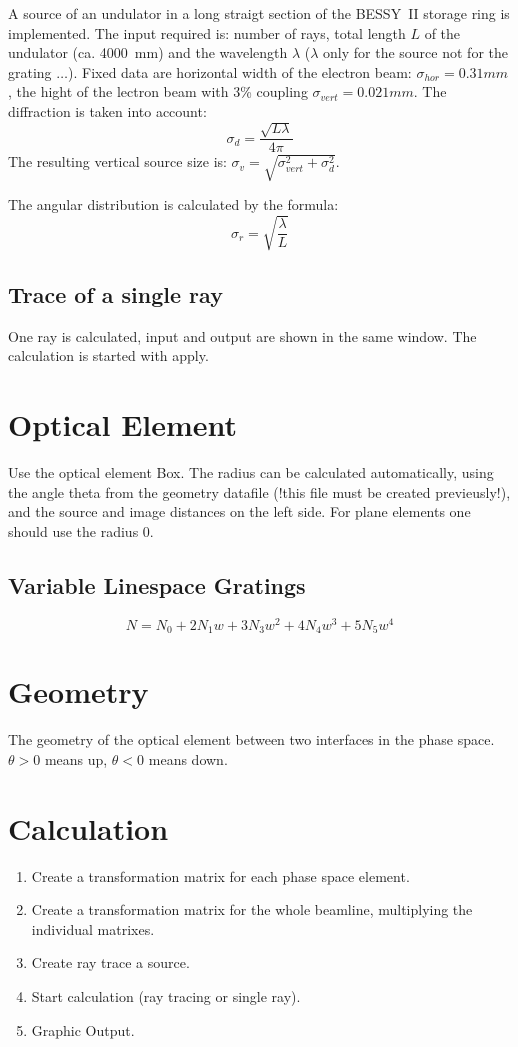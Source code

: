 A source of an undulator in a long straigt section of the
BESSY~II storage ring is implemented. The input required is: number of rays,
total length $L$ of the undulator (ca. 4000~mm) and the wavelength $ \lambda$
($\lambda$ only for the source not for the grating $\ldots$). 
Fixed data are  
horizontal width of the electron beam: $\sigma_{hor} = 0.31 mm$, the hight of 
the lectron beam with 3\% coupling $\sigma_{vert} = 0.021 mm$. The diffraction 
is taken into account:
\[ \sigma_d = \frac{\sqrt{L \lambda}}{4\pi} \] 
The resulting vertical source size is: 
$\sigma_{v}=\sqrt{\sigma_{vert}^2+\sigma_d^2}$.

The angular distribution is calculated by the formula:
\[ \sigma_r= \sqrt{\frac{\lambda}{L}} \]

\subsection {Trace of a single ray}
One ray is calculated, input and output are shown in the same window. The
calculation is started with apply.

\section {Optical Element} 
Use the optical element Box. The radius can be calculated automatically, using
the angle theta from the geometry datafile (!this file must be created
previeusly!), and the source and image distances on the left side. For plane
elements one should use the radius 0. 

\subsection {Variable Linespace Gratings}
\[ N = N_0 + 2 N_1 w + 3 N_3 w^2 + 4 N_4 w^3 + 5 N_5 w^4 \]
 
\section {Geometry} 
The geometry of the optical element between two interfaces in the phase space.
$\theta > 0$ means up, $\theta < 0$ means down.


\section {Calculation}
\begin {enumerate} 
\item Create a transformation matrix for each phase space element.
\item Create a transformation matrix for the whole beamline, multiplying the
individual matrixes.
\item Create ray trace a source.
\item Start calculation (ray tracing or single ray).
\item Graphic Output.
\end {enumerate} 

